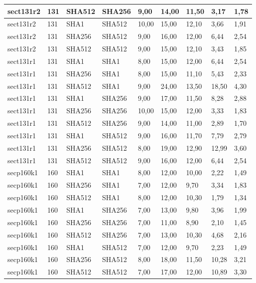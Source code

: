 \begin{longtable}{| l | l | l | l | l |l |l |l |l |}
sect131r2 & 131 & SHA512 & SHA256 & 9,00 & 14,00 & 11,50 & 3,17 & 1,78 \\ \hline 
sect131r2 & 131 & SHA1 & SHA512 & 10,00 & 15,00 & 12,10 & 3,66 & 1,91 \\ \hline 
sect131r2 & 131 & SHA256 & SHA512 & 9,00 & 16,00 & 12,00 & 6,44 & 2,54 \\ \hline 
sect131r2 & 131 & SHA512 & SHA512 & 9,00 & 15,00 & 12,10 & 3,43 & 1,85 \\ \hline 
sect131r1 & 131 & SHA1 & SHA1 & 8,00 & 15,00 & 12,00 & 6,44 & 2,54 \\ \hline 
sect131r1 & 131 & SHA256 & SHA1 & 8,00 & 15,00 & 11,10 & 5,43 & 2,33 \\ \hline 
sect131r1 & 131 & SHA512 & SHA1 & 9,00 & 24,00 & 13,50 & 18,50 & 4,30 \\ \hline 
sect131r1 & 131 & SHA1 & SHA256 & 9,00 & 17,00 & 11,50 & 8,28 & 2,88 \\ \hline 
sect131r1 & 131 & SHA256 & SHA256 & 10,00 & 15,00 & 12,00 & 3,33 & 1,83 \\ \hline 
sect131r1 & 131 & SHA512 & SHA256 & 9,00 & 14,00 & 11,00 & 2,89 & 1,70 \\ \hline 
sect131r1 & 131 & SHA1 & SHA512 & 9,00 & 16,00 & 11,70 & 7,79 & 2,79 \\ \hline 
sect131r1 & 131 & SHA256 & SHA512 & 8,00 & 19,00 & 12,90 & 12,99 & 3,60 \\ \hline 
sect131r1 & 131 & SHA512 & SHA512 & 9,00 & 16,00 & 12,00 & 6,44 & 2,54 \\ \hline 
secp160k1 & 160 & SHA1 & SHA1 & 8,00 & 12,00 & 10,00 & 2,22 & 1,49 \\ \hline 
secp160k1 & 160 & SHA256 & SHA1 & 7,00 & 12,00 & 9,70 & 3,34 & 1,83 \\ \hline 
secp160k1 & 160 & SHA512 & SHA1 & 8,00 & 12,00 & 10,30 & 1,79 & 1,34 \\ \hline 
secp160k1 & 160 & SHA1 & SHA256 & 7,00 & 13,00 & 9,80 & 3,96 & 1,99 \\ \hline 
secp160k1 & 160 & SHA256 & SHA256 & 7,00 & 11,00 & 8,90 & 2,10 & 1,45 \\ \hline 
secp160k1 & 160 & SHA512 & SHA256 & 7,00 & 13,00 & 10,30 & 4,68 & 2,16 \\ \hline 
secp160k1 & 160 & SHA1 & SHA512 & 7,00 & 12,00 & 9,70 & 2,23 & 1,49 \\ \hline 
secp160k1 & 160 & SHA256 & SHA512 & 8,00 & 18,00 & 11,50 & 10,28 & 3,21 \\ \hline 
secp160k1 & 160 & SHA512 & SHA512 & 7,00 & 17,00 & 12,00 & 10,89 & 3,30 \\ \hline 

\end{longtable}
